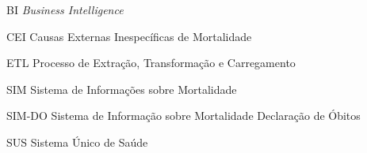 \begin{siglas}
    
    \item[BI] \textit{Business Intelligence}
    \item[CEI] Causas Externas Inespecíficas de Mortalidade
    \item[ETL] Processo de Extração, Transformação e Carregamento
    \item[SIM] Sistema de Informações sobre Mortalidade
    \item[SIM-DO] Sistema de Informação sobre Mortalidade Declaração de Óbitos
    \item[SUS] Sistema Único de Saúde
    
\end{siglas}
